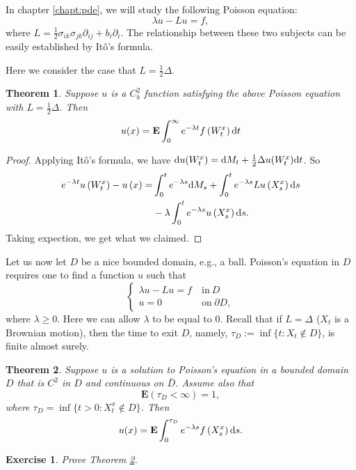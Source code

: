 \documentclass[twoside, 12pt]{book}
\numberwithin{equation}{chapter}
\newtheorem{theorem}{Theorem}[section]
\newtheorem{exercise}{Exercise}[section]
\def\bE{{\mathbf E}}
\def\geq{\geqslant}
\def\p{\partial}
\def\d{\text{\rm{d}}}
\begin{document}
	In chapter \ref{chapt:pde}, we will study the following Poisson equation: 
	\[
	    \lambda u - L u =f, 
	\]
	where $L=\frac{1}{2}\sigma_{ik}\sigma_{jk}\p_{ij}+b_i\p_i$. 
	The relationship between these two subjects can be easily established by It\^o's formula. 

\medspace
	
	Here we consider the case that $L=\frac{1}{2}\Delta$. 
	
	
	\begin{theorem}\label{thm:FK1}
		Suppose $u$ is a $C^2_b$ function satisfying the above Poisson equation with $L=\frac{1}{2}\Delta$. Then
		$$
		u(x)=\mathbf{E} \int_0^{\infty} e^{-\lambda t} f\left(W^x_t\right) \d t
		$$
	\end{theorem}
	\begin{proof}
		Applying It\^o's formula, we have 
		$\d u(W^x_t)=\d M_t + \frac{1}{2}\Delta u(W^x_t) \d t$. So 
		\[
		    \begin{aligned}
		    	e^{-\lambda t} u\left(W_t^x\right)-u\left(x\right)=&\int_0^t e^{-\lambda s} \d M_s+\int_0^t e^{-\lambda s} L u\left(X^x_s\right) \d s \\
		    	&-\lambda \int_0^t e^{-\lambda s} u\left(X^x_s\right) \d s.
		    \end{aligned}
		\]
		Taking expection, we get what we claimed. 
	\end{proof}
	
	Let us now let $D$ be a nice bounded domain, e.g., a ball. Poisson's equation in $D$ requires one to find a function $u$ such that 
	\begin{equation*}
		\begin{cases}
			\lambda u- Lu=f ~&\mbox{in}~ D\\
			u=0 ~&\mbox{on}~ \p D, 
		\end{cases}
	\end{equation*}
	where $\lambda\geq 0$. Here we can allow $\lambda$ to be equal to $0$. Recall that if $L=\Delta$ ($X_t$ is a Brownian motion), then the time to exit $D$, namely, $\tau_D := \inf\{t : X_t \notin D\}$, is finite almost surely. 
	
	\begin{theorem}\label{thm:PR-Dir}
		Suppose $u$ is a solution to Poisson's equation in a bounded domain $D$ that is $C^2$ in $D$ and continuous on $\bar{D}$. Assume also that 
		\begin{equation*}%
			\bE(\tau_D<\infty)=1, 
		\end{equation*}
		where $\tau_D=\inf\{t>0: X^x_t\notin D\}$. Then
		\[
		    u(x)=\mathbf{E} \int_0^{\tau_D} e^{-\lambda s} f\left(X_s^x\right) \d s.		
		\]
	\end{theorem}
	\begin{exercise}
		Prove Theorem \ref{thm:PR-Dir}. 
	\end{exercise}
	
\end{document}

